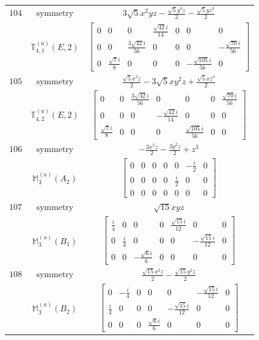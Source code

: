 \documentclass[fleqn,8pt,landscape]{jsarticle}
\begin{document}
\begin{longtable}{ccc}
$ 104 $ & $ \text{symmetry} $ & $ 3 \sqrt{5} x^{2} y z - \frac{\sqrt{5} y^{3} z}{2} - \frac{\sqrt{5} y z^{3}}{2} $ \\
$  $ & $ \mathbb{T}_{4,1}^{(a)}(E,2) $ & $ \begin{bmatrix} 0 & 0 & 0 & \frac{\sqrt{42} i}{14} & 0 & 0 & 0 \\ 0 & 0 & \frac{3 \sqrt{42} i}{56} & 0 & 0 & 0 & - \frac{\sqrt{70} i}{56} \\ 0 & \frac{\sqrt{7} i}{8} & 0 & 0 & 0 & - \frac{\sqrt{105} i}{56} & 0 \end{bmatrix} $ \\ \hline
$ 105 $ & $ \text{symmetry} $ & $ \frac{\sqrt{5} x^{3} z}{2} - 3 \sqrt{5} x y^{2} z + \frac{\sqrt{5} x z^{3}}{2} $ \\
$  $ & $ \mathbb{T}_{4,2}^{(a)}(E,2) $ & $ \begin{bmatrix} 0 & 0 & \frac{3 \sqrt{42} i}{56} & 0 & 0 & 0 & \frac{\sqrt{70} i}{56} \\ 0 & 0 & 0 & - \frac{\sqrt{42} i}{14} & 0 & 0 & 0 \\ \frac{\sqrt{7} i}{8} & 0 & 0 & 0 & \frac{\sqrt{105} i}{56} & 0 & 0 \end{bmatrix} $ \\ \hline
$ 106 $ & $ \text{symmetry} $ & $ - \frac{3 x^{2} z}{2} - \frac{3 y^{2} z}{2} + z^{3} $ \\
$  $ & $ \mathbb{M}_{3}^{(a)}(A_{2}) $ & $ \begin{bmatrix} 0 & 0 & 0 & 0 & 0 & - \frac{i}{2} & 0 \\ 0 & 0 & 0 & 0 & \frac{i}{2} & 0 & 0 \\ 0 & 0 & 0 & 0 & 0 & 0 & 0 \end{bmatrix} $ \\ \hline
$ 107 $ & $ \text{symmetry} $ & $ \sqrt{15} x y z $ \\
$  $ & $ \mathbb{M}_{3}^{(a)}(B_{1}) $ & $ \begin{bmatrix} \frac{i}{4} & 0 & 0 & 0 & \frac{\sqrt{15} i}{12} & 0 & 0 \\ 0 & \frac{i}{4} & 0 & 0 & 0 & - \frac{\sqrt{15} i}{12} & 0 \\ 0 & 0 & - \frac{\sqrt{6} i}{6} & 0 & 0 & 0 & 0 \end{bmatrix} $ \\ \hline
$ 108 $ & $ \text{symmetry} $ & $ \frac{\sqrt{15} x^{2} z}{2} - \frac{\sqrt{15} y^{2} z}{2} $ \\
$  $ & $ \mathbb{M}_{3}^{(a)}(B_{2}) $ & $ \begin{bmatrix} 0 & - \frac{i}{4} & 0 & 0 & 0 & - \frac{\sqrt{15} i}{12} & 0 \\ \frac{i}{4} & 0 & 0 & 0 & - \frac{\sqrt{15} i}{12} & 0 & 0 \\ 0 & 0 & 0 & \frac{\sqrt{6} i}{6} & 0 & 0 & 0 \end{bmatrix} $ \\ \hline

\end{longtable}
\end{document}
